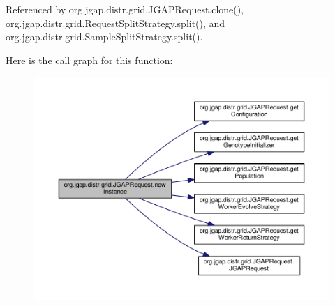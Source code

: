 Referenced by org.\-jgap.\-distr.\-grid.\-J\-G\-A\-P\-Request.\-clone(), org.\-jgap.\-distr.\-grid.\-Request\-Split\-Strategy.\-split(), and org.\-jgap.\-distr.\-grid.\-Sample\-Split\-Strategy.\-split().



Here is the call graph for this function\-:
\nopagebreak
\begin{figure}[H]
\begin{center}
\leavevmode
\includegraphics[width=350pt]{classorg_1_1jgap_1_1distr_1_1grid_1_1_j_g_a_p_request_a4ee3cacfb06afe6a2ebac82c11296742_cgraph}
\end{center}
\end{figure}


